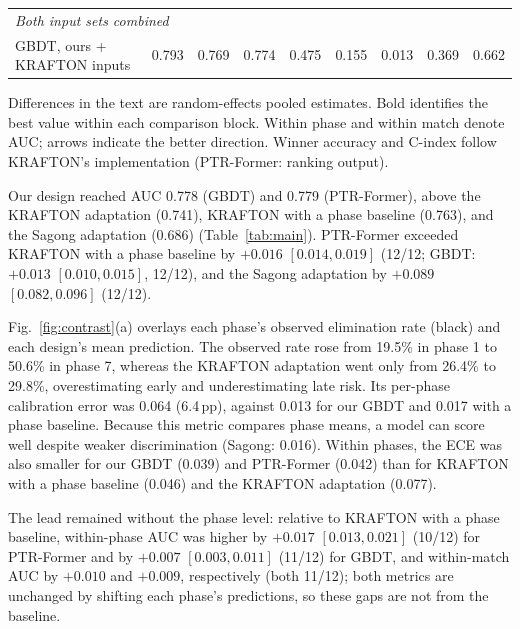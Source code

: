 \documentclass[sigconf,anonymous,nonacm]{acmart}
\begin{document}
\begin{table}[t]
\begin{tabular*}{\textwidth}{@{\extracolsep{\fill}}lcccccccc@{}}
\midrule
\multicolumn{9}{l}{\emph{Both input sets combined}} \\
GBDT, ours + KRAFTON inputs & 0.793 & 0.769 & 0.774 & 0.475 & 0.155 & 0.013 & 0.369 & 0.662 \\
\bottomrule
\end{tabular*}
\smallskip
\begin{minipage}{\textwidth}\scriptsize
Differences in the text are random-effects pooled estimates. Bold identifies the best value within each comparison block. Within phase and within match denote AUC; arrows indicate the better direction. Winner accuracy and C-index follow KRAFTON's implementation (PTR-Former: ranking output).
\end{minipage}
\end{table}
Our design reached AUC 0.778 (GBDT) and 0.779 (PTR-Former), above the KRAFTON adaptation (0.741), KRAFTON with a phase baseline (0.763), and the Sagong adaptation (0.686) (Table~\ref{tab:main}).
PTR-Former exceeded KRAFTON with a phase baseline by $+0.016$ $[0.014, 0.019]$ (12/12; GBDT: $+0.013$ $[0.010, 0.015]$, 12/12), and the Sagong adaptation by $+0.089$ $[0.082, 0.096]$ (12/12).

Fig.~\ref{fig:contrast}(a) overlays each phase's observed elimination rate (black) and each design's mean prediction.
The observed rate rose from 19.5\% in phase 1 to 50.6\% in phase 7, whereas the KRAFTON adaptation went only from 26.4\% to 29.8\%, overestimating early and underestimating late risk.
Its per-phase calibration error was 0.064 (6.4\,pp), against 0.013 for our GBDT and 0.017 with a phase baseline. Because this metric compares phase means, a model can score well despite weaker discrimination (Sagong: 0.016).
Within phases, the ECE was also smaller for our GBDT (0.039) and PTR-Former (0.042) than for KRAFTON with a phase baseline (0.046) and the KRAFTON adaptation (0.077).

The lead remained without the phase level: relative to KRAFTON with a phase baseline, within-phase AUC was higher by $+0.017$ $[0.013, 0.021]$ (10/12) for PTR-Former and by $+0.007$ $[0.003, 0.011]$ (11/12) for GBDT, and within-match AUC by $+0.010$ and $+0.009$, respectively (both 11/12); both metrics are unchanged by shifting each phase's predictions, so these gaps are not from the baseline.
\end{document}
